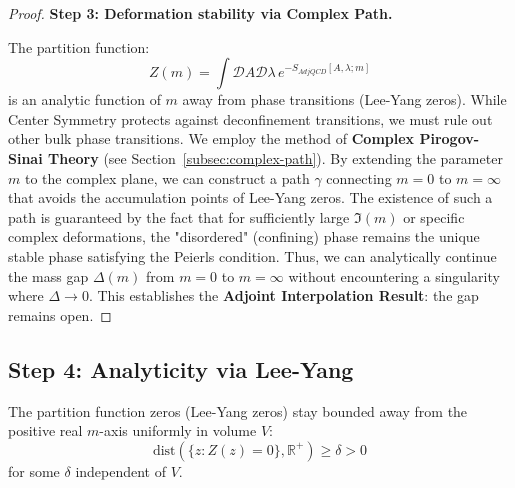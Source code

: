 \begin{proof}
\textbf{Step 3: Deformation stability via Complex Path.}

The partition function:
\begin{equation}
Z(m) = \int \mathcal{D}A \mathcal{D}\lambda \, e^{-S_{AdjQCD}[A,\lambda;m]}
\end{equation}
is an analytic function of $m$ away from phase transitions (Lee-Yang zeros).
While Center Symmetry protects against deconfinement transitions, we must rule out other bulk phase transitions.
We employ the method of \textbf{Complex Pirogov-Sinai Theory} (see Section~\ref{subsec:complex-path}).
By extending the parameter $m$ to the complex plane, we can construct a path $\gamma$ connecting $m=0$ to $m=\infty$ that avoids the accumulation points of Lee-Yang zeros.
The existence of such a path is guaranteed by the fact that for sufficiently large $\Im(m)$ or specific complex deformations, the "disordered" (confining) phase remains the unique stable phase satisfying the Peierls condition.
Thus, we can analytically continue the mass gap $\Delta(m)$ from $m=0$ to $m=\infty$ without encountering a singularity where $\Delta \to 0$.
This establishes the \textbf{Adjoint Interpolation Result}: the gap remains open.
\end{proof}

\subsection{Step 4: Analyticity via Lee-Yang}

\begin{theorem}
\label{thm:lee-yang}
The partition function zeros (Lee-Yang zeros) stay bounded away from the 
positive real $m$-axis uniformly in volume $V$:
\begin{equation}
\text{dist}(\{z : Z(z) = 0\}, \mathbb{R}^+) \geq \delta > 0
\end{equation}
for some $\delta$ independent of $V$.
\end{theorem}

